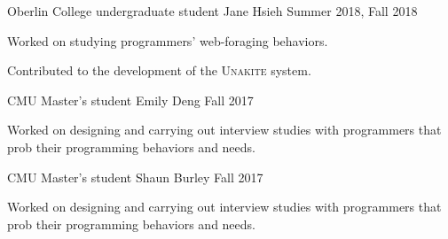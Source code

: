 
\begin{cventries}
  \cventry
    {Oberlin College undergraduate student} %
    {Jane Hsieh} %
    {Summer 2018, Fall 2018} %
    {} %
    {
      \begin{cvitems} %
        \item {Worked on studying programmers' web-foraging behaviors.}
        \item {Contributed to the development of the \textsc{Unakite} system.}
      \end{cvitems}
    }

  \cventry
    {CMU Master's student} %
    {Emily Deng} %
    {Fall 2017} %
    {} %
    {
      \begin{cvitems} %
        \item {Worked on designing and carrying out interview studies with programmers that prob their programming behaviors and needs.}
      \end{cvitems}
    }

  \cventry
    {CMU Master's student} %
    {Shaun Burley} %
    {Fall 2017} %
    {} %
    {
      \begin{cvitems} %
        \item {Worked on designing and carrying out interview studies with programmers that prob their programming behaviors and needs.}
      \end{cvitems}
    }

\end{cventries}
